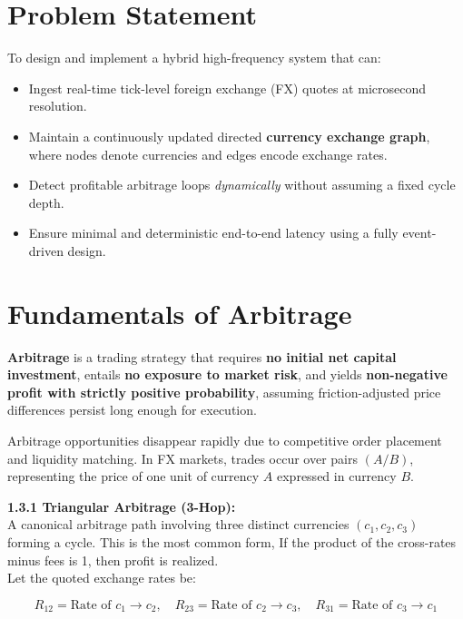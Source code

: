 \documentclass[letterpaper,11pt]{report}
\begin{document}
\section{Problem Statement}

To design and implement a hybrid high-frequency system that can:

\begin{itemize}
    \item Ingest real-time tick-level foreign exchange (FX) quotes at microsecond resolution.
    \item Maintain a continuously updated directed \textbf{currency exchange graph}, where nodes denote currencies and edges encode exchange rates.
    \item Detect profitable arbitrage loops \emph{dynamically} without assuming a fixed cycle depth.
    \item Ensure minimal and deterministic end-to-end latency using a fully event-driven design.
\end{itemize}



\section{Fundamentals of Arbitrage}


 
\textbf{Arbitrage} is a trading strategy that requires \textbf{no initial net capital investment}, entails \textbf{no exposure to market risk}, 
and yields \textbf{non-negative profit with strictly positive probability}, 
assuming friction-adjusted price differences persist long enough for execution.
\vspace{1em}

Arbitrage opportunities disappear rapidly due to competitive order placement and liquidity matching. 
In FX markets, trades occur over pairs $(A/B)$, representing the price of one unit of currency $A$ expressed in currency $B$.

\vspace{1em}

\textbf{1.3.1 Triangular Arbitrage (3-Hop):} \\ 
A canonical arbitrage path involving three distinct currencies $(c_1, c_2, c_3)$ forming a cycle. This is the most common form, If the product of the cross-rates minus fees is 1, then profit is realized.\\
Let the quoted exchange rates be:


\[
R_{12} = \text{Rate~of~} c_1 \to c_2, \quad
R_{23} = \text{Rate~of~} c_2 \to c_3, \quad
R_{31} = \text{Rate~of~} c_3 \to c_1
\]
\end{document}
